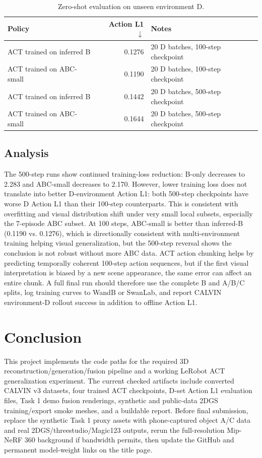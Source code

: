 \documentclass[10pt]{article}
\begin{document}
\begin{table}[h]
\centering
\caption{Zero-shot evaluation on unseen environment D.}
\begin{tabular}{lrl}
\toprule
Policy & Action L1 $\downarrow$ & Notes \\
\midrule
ACT trained on inferred B & 0.1276 & 20 D batches, 100-step checkpoint \\
ACT trained on ABC-small & 0.1190 & 20 D batches, 100-step checkpoint \\
ACT trained on inferred B & 0.1442 & 20 D batches, 500-step checkpoint \\
ACT trained on ABC-small & 0.1644 & 20 D batches, 500-step checkpoint \\
\bottomrule
\end{tabular}
\end{table}

\subsection{Analysis}
The 500-step runs show continued training-loss reduction: B-only decreases to 2.283 and ABC-small decreases to 2.170. However, lower training loss does not translate into better D-environment Action L1: both 500-step checkpoints have worse D Action L1 than their 100-step counterparts. This is consistent with overfitting and visual distribution shift under very small local subsets, especially the 7-episode ABC subset. At 100 steps, ABC-small is better than inferred-B (0.1190 vs. 0.1276), which is directionally consistent with multi-environment training helping visual generalization, but the 500-step reversal shows the conclusion is not robust without more ABC data. ACT action chunking helps by predicting temporally coherent 100-step action sequences, but if the first visual interpretation is biased by a new scene appearance, the same error can affect an entire chunk. A full final run should therefore use the complete B and A/B/C splits, log training curves to WandB or SwanLab, and report CALVIN environment-D rollout success in addition to offline Action L1.

\section{Conclusion}
This project implements the code paths for the required 3D reconstruction/generation/fusion pipeline and a working LeRobot ACT generalization experiment. The current checked artifacts include converted CALVIN v3 datasets, four trained ACT checkpoints, D-set Action L1 evaluation files, Task 1 demo fusion renderings, synthetic and public-data 2DGS training/export smoke meshes, and a buildable report. Before final submission, replace the synthetic Task 1 proxy assets with phone-captured object A/C data and real 2DGS/threestudio/Magic123 outputs, rerun the full-resolution Mip-NeRF 360 background if bandwidth permits, then update the GitHub and permanent model-weight links on the title page.



\end{document}
